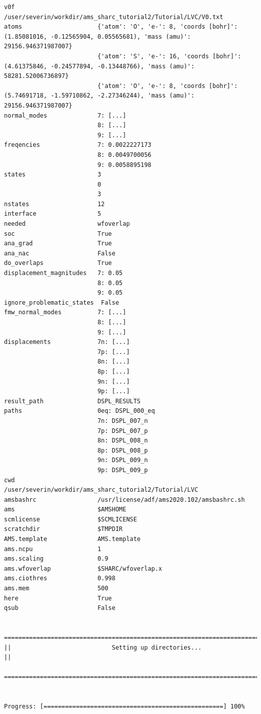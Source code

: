 \documentclass[a4paper,11pt,DIV=15,openany]{scrbook}
\begin{document}
\begin{oframed}
\begin{Verbatim}[commandchars=\\\{\}]
v0f                       /user/severin/workdir/ams_sharc_tutorial2/Tutorial/LVC/V0.txt
atoms                     {'atom': 'O', 'e-': 8, 'coords [bohr]': (1.85081016, -0.12565904, 0.05565681), 'mass (amu)': 29156.946371987007}
                          {'atom': 'S', 'e-': 16, 'coords [bohr]': (4.61375846, -0.24577894, -0.13448766), 'mass (amu)': 58281.52006736897}
                          {'atom': 'O', 'e-': 8, 'coords [bohr]': (5.74691718, -1.59710862, -2.27346244), 'mass (amu)': 29156.946371987007}
normal_modes              7: [...]
                          8: [...]
                          9: [...]
freqencies                7: 0.0022227173
                          8: 0.0049700056
                          9: 0.0058895198
states                    3
                          0
                          3
nstates                   12
interface                 5
needed                    wfoverlap
soc                       True
ana_grad                  True
ana_nac                   False
do_overlaps               True
displacement_magnitudes   7: 0.05
                          8: 0.05
                          9: 0.05
ignore_problematic_states  False
fmw_normal_modes          7: [...]
                          8: [...]
                          9: [...]
displacements             7n: [...]
                          7p: [...]
                          8n: [...] 
                          8p: [...] 
                          9n: [...]
                          9p: [...]
result_path               DSPL_RESULTS
paths                     0eq: DSPL_000_eq
                          7n: DSPL_007_n
                          7p: DSPL_007_p
                          8n: DSPL_008_n
                          8p: DSPL_008_p
                          9n: DSPL_009_n
                          9p: DSPL_009_p
cwd                       /user/severin/workdir/ams_sharc_tutorial2/Tutorial/LVC
amsbashrc                 /usr/license/adf/ams2020.102/amsbashrc.sh
ams                       $AMSHOME
scmlicense                $SCMLICENSE
scratchdir                $TMPDIR
AMS.template              AMS.template
ams.ncpu                  1
ams.scaling               0.9
ams.wfoverlap             $SHARC/wfoverlap.x
ams.ciothres              0.998
ams.mem                   500
here                      True
qsub                      False

  ================================================================================
||                            Setting up directories...                           ||
  ================================================================================


Progress: [==================================================] 100%
\end{Verbatim}
\end{oframed}
\end{document}
